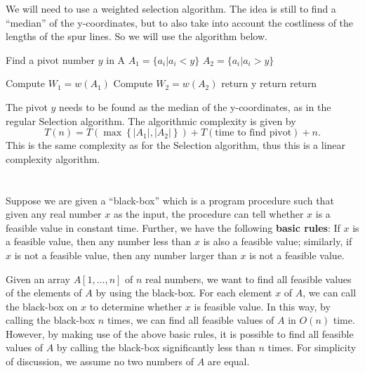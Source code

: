\documentclass{article}
\begin{document}
We will need to use a weighted selection algorithm.  The idea is still
to find a ``median'' of the y-coordinates, but to also take into
account the costliness of the lengths of the spur lines.
So we will use the algorithm below.

{\singlespacing
\begin{algorithmic}
  \State Find a pivot number $y$ in A 
  \State $A_1 = \{a_i | a_i < y \}$    
  \State $A_2 = \{a_i | a_i > y \}$    
 

  \State Compute $W_1 = w(A_1)$   
  \State Compute $W_2 = w(A_2)$   
    \State return y
    \State return  %
  \Else%
    \State return 
  \EndIf
\EndFunction
\end{algorithmic}
}

The pivot $y$ needs to be found as the median of the y-coordinates, as
in the regular Selection algorithm.  The algorithmic complexity is
given by
\begin{equation*}
     T(n) = T\left(\max\left\{\left|A_1\right|,
      \left|A_2\right|\right\}\right)  + T\left(\text{time to find
      pivot}\right)   + n. 
\end{equation*}
This is the same complexity as for the Selection algorithm, thus this
is a linear complexity algorithm.









\section{}
Suppose we are given a ``black-box'' which is a program procedure such
that given any real number $x$ as the input, the procedure can tell
whether $x$ is a feasible value in constant time. Further, we have the
following {\bf basic rules}: If $x$ is a feasible value, then any
number less 
than $x$ is also a feasible value; similarly, if $x$ is not a feasible
value, then any number larger than $x$ is not a feasible value. 

Given an array $A[1, \dots , n]$ of $n$ real numbers, we want to find
all feasible values of the elements of $A$ by using the black-box. For
each element $x$ of $A$, we can call the black-box on $x$ to determine
whether $x$ is feasible value. In this way, by calling the black-box 
$n$ times, we can find all feasible values of $A$ in $O(n)$
time. However, by making use of the above basic rules, it is possible
to find all feasible values of $A$ by calling the black-box
significantly less than $n$ times. For simplicity of discussion, we
assume no two numbers of $A$ are equal.
\end{document}
